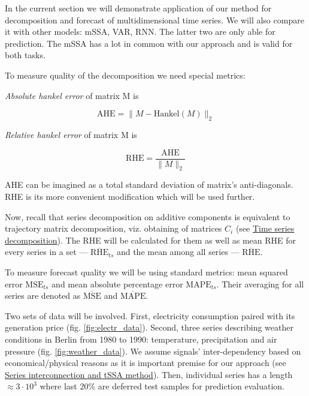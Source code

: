	In the current section we will demonstrate application of our method for decomposition and forecast of multidimensional time series. We will also compare it with other models: mSSA, VAR, RNN. The latter two are only able for prediction. The mSSA has a lot in common with our approach and is valid for both tasks.
	
	To measure quality of the decomposition we need special metrics:
	
	\begin{Def}
		\emph{Absolute hankel error} of matrix M is 
		
		\[
		\text{AHE} = \lVert M - \text{Hankel}(M) \rVert_2
		\] 
		
	\end{Def}	
	
	\begin{Def}		
		
		\emph{Relative hankel error} of matrix M is 
		
		\[
		\text{RHE} = \frac{\text{AHE}}{\lVert M \rVert_2} 
		\] 		
		
	\end{Def}
	
	AHE can be imagined as a total standard deviation of matrix's anti-diagonals. RHE is its more convenient modification which will be used further.	
	
	Now, recall that series decomposition on additive components is equivalent to trajectory matrix decomposition, viz. obtaining of matrices $ C_i $ (see \hyperref[sec:decomposition]{Time series decomposition}). The RHE will be calculated for them as well as mean RHE for every series in a set --- $ \overline{\text{RHE}}_{ts} $ and the mean among all series --- $ \overline{\text{RHE}} $. 
	
	To measure forecast quality we will be using standard metrics: mean squared error $ \text{MSE}_{ts} $ and mean absolute percentage error $ \text{MAPE}_{ts} $. Their averaging for all series are denoted as $ \overline{\text{MSE}} $ and $ \overline{\text{MAPE}} $.
	
	Two sets of data will be involved. First, electricity consumption paired with its generation price (fig. \ref{fig:electr_data}). Second, three series describing weather conditions in Berlin from 1980 to 1990: temperature, precipitation and air pressure (fig. \ref{fig:weather_data}). We assume signals' inter-dependency based on economical/physical reasons as it is important premise for our approach (see \hyperref[sec:tssa_method]{Series interconnection and tSSA method}). Then, individual series has a length $ \approx 3 \cdot 10^3 $ where last $ 20\% $ are deferred test samples for prediction evaluation.
	
